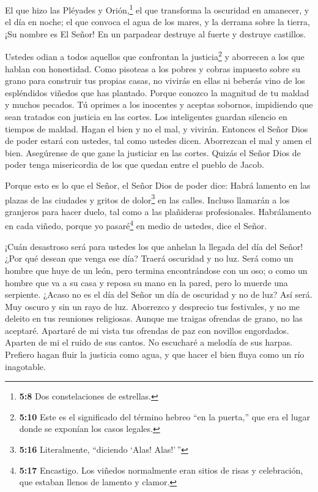  El que hizo las Pléyades y Orión,\footnote{\textbf{5:8} Dos
  constelaciones de estrellas.} el que transforma la oscuridad en
amanecer, y el día en noche; el que convoca el agua de los mares, y la
derrama sobre la tierra, ¡Su nombre es El Señor!  En un
parpadear destruye al fuerte y destruye castillos.

 Ustedes odian a todos aquellos que confrontan la
justicia\footnote{\textbf{5:10} Este es el significado del término
  hebreo ``en la puerta,'' que era el lugar donde se exponían los casos
  legales.} y aborrecen a los que hablan con honestidad. 
Como pisoteas a los pobres y cobras impuesto sobre su grano para
construir tus propias casas, no vivirás en ellas ni beberás vino de los
espléndidos viñedos que has plantado.  Porque conozco la
magnitud de tu maldad y muchos pecados. Tú oprimes a los inocentes y
aceptas sobornos, impidiendo que sean tratados con justicia en las
cortes.  Los inteligentes guardan silencio en tiempos de
maldad.  Hagan el bien y no el mal, y vivirán. Entonces el
Señor Dios de poder estará con ustedes, tal como ustedes dicen.
 Aborrezcan el mal y amen el bien. Asegúrense de que gane
la justiciar en las cortes. Quizás el Señor Dios de poder tenga
misericordia de los que quedan entre el pueblo de Jacob.

 Porque esto es lo que el Señor, el Señor Dios de poder
dice: Habrá lamento en las plazas de las ciudades y gritos de
dolor\footnote{\textbf{5:16} Literalmente, ``diciendo `Alas! Alas!'\,''}
en las calles. Incluso llamarán a los granjeros para hacer duelo, tal
como a las plañideras profesionales.  Habrálamento en cada
viñedo, porque yo pasaré\footnote{\textbf{5:17} Encastigo. Los viñedos
  normalmente eran sitios de risas y celebración, que estaban llenos de
  lamento y clamor.} en medio de ustedes, dice el Señor.

 ¡Cuán desastroso será para ustedes los que anhelan la
llegada del día del Señor! ¿Por qué desean que venga ese día? Traerá
oscuridad y no luz.  Será como un hombre que huye de un
león, pero termina encontrándose con un oso; o como un hombre que va a
su casa y reposa su mano en la pared, pero lo muerde una serpiente.
 ¿Acaso no es el día del Señor un día de oscuridad y no de
luz? Así será. Muy oscuro y sin un rayo de luz.  Aborrezco
y desprecio tus festivales, y no me deleito en tus reuniones religiosas.
 Aunque me traigas ofrendas de grano, no las aceptaré.
Apartaré de mi vista tus ofrendas de paz con novillos engordados.
 Aparten de mi el ruido de sus cantos. No escucharé a
melodía de sus harpas.  Prefiero hagan fluir la justicia
como agua, y que hacer el bien fluya como un río inagotable.

